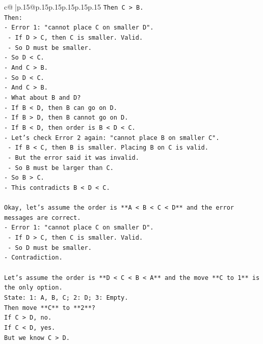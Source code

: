 \documentclass{article}
\begin{document}
{\begin{supertabular}{c@{$\;$}|p{.15\linewidth}@{}p{.15\linewidth}p{.15\linewidth}p{.15\linewidth}p{.15\linewidth}p{.15\linewidth}}
{{{\texttt{Then C > B.} \\
\texttt{Then:} \\
\texttt{{-} Error 1: "cannot place C on smaller D".} \\
\texttt{    {-} If D > C, then C is smaller. Valid.} \\
\texttt{    {-} So D must be smaller.} \\
\texttt{{-} So D < C.} \\
\texttt{{-} And C > B.} \\
\texttt{{-} So D < C.} \\
\texttt{{-} And C > B.} \\
\texttt{{-} What about B and D?} \\
\texttt{{-} If B < D, then B can go on D.} \\
\texttt{{-} If B > D, then B cannot go on D.} \\
\texttt{{-} If B < D, then order is B < D < C.} \\
\texttt{{-} Let's check Error 2 again: "cannot place B on smaller C".} \\
\texttt{    {-} If B < C, then B is smaller. Placing B on C is valid.} \\
\texttt{    {-} But the error said it was invalid.} \\
\texttt{    {-} So B must be larger than C.} \\
\texttt{{-} So B > C.} \\
\texttt{{-} This contradicts B < D < C.} \\
\\ 
\texttt{Okay, let's assume the order is **A < B < C < D** and the error messages are correct.} \\
\texttt{{-} Error 1: "cannot place C on smaller D".} \\
\texttt{    {-} If D > C, then C is smaller. Valid.} \\
\texttt{    {-} So D must be smaller.} \\
\texttt{{-} Contradiction.} \\
\\ 
\texttt{Let's assume the order is **D < C < B < A** and the move **C to 1** is the only option.} \\
\texttt{State: 1: A, B, C; 2: D; 3: Empty.} \\
\texttt{Then move **C** to **2**?} \\
\texttt{If C > D, no.} \\
\texttt{If C < D, yes.} \\
\texttt{But we know C > D.} \\
}}}
\end{supertabular}}
\end{document}

